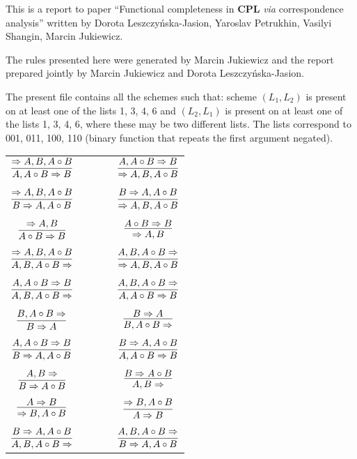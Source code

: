 \documentclass[11pt]{article}
\begin{document}
	
	This is a report to paper ``Functional completeness in \textbf{CPL} \textit{via} correspondence analysis'' written by Dorota Leszczy\'{n}ska-Jasion, 
	Yaroslav Petrukhin, Vasilyi Shangin, Marcin Jukiewicz. 
	
	The rules presented here were generated by Marcin Jukiewicz and the report prepared jointly by Marcin Jukiewicz and Dorota Leszczy\'{n}ska-Jasion.
	
	The present file contains all the schemes such that: scheme $(L_1, L_2)$ is present on at least one of the lists 1, 3, 4, 6 and $(L_2, L_1)$ is present on at least one of the lists 1, 3, 4, 6, where these may be two different lists. The lists correspond to 001, 011, 100, 110 (binary function that repeats the first argument negated).
	
	\bigskip
\begin{center}

\begin{tabular}{ccc}
$\infer{A, A\circ B\Rightarrow B}{\Rightarrow A, B, A\circ B}$ & \ \ \ \ & $\infer{\Rightarrow A, B, A\circ B}{A, A\circ B\Rightarrow B}$ \\
&& \\
$\infer{B\Rightarrow A, A\circ B}{\Rightarrow A, B, A\circ B}$ && $\infer{\Rightarrow A, B, A\circ B}{B\Rightarrow A, A\circ B}$ \\
&& \\
$\infer{A\circ B\Rightarrow B}{\Rightarrow A, B}$ && $\infer{\Rightarrow A, B}{A\circ B\Rightarrow B}$ \\
&& \\
$\infer{A, B, A\circ B\Rightarrow }{\Rightarrow A, B, A\circ B}$ && $\infer{\Rightarrow A, B, A\circ B}{A, B, A\circ B\Rightarrow }$ \\
&& \\
$\infer{A, B, A\circ B\Rightarrow }{A, A\circ B\Rightarrow B}$ && $\infer{A, A\circ B\Rightarrow B}{A, B, A\circ B\Rightarrow }$ \\
&& \\
$\infer{B\Rightarrow A}{B, A\circ B\Rightarrow }$ && $\infer{B, A\circ B\Rightarrow }{B\Rightarrow A}$ \\
&& \\
$\infer{B\Rightarrow A, A\circ B}{A, A\circ B\Rightarrow B}$ && $\infer{A, A\circ B\Rightarrow B}{B\Rightarrow A, A\circ B}$ \\
&& \\
$\infer{B\Rightarrow A\circ B}{A, B\Rightarrow }$ && $\infer{A, B\Rightarrow }{B\Rightarrow A\circ B}$ \\
&& \\
$\infer{\Rightarrow B, A\circ B}{A\Rightarrow B}$ && $\infer{A\Rightarrow B}{\Rightarrow B, A\circ B}$ \\
&& \\
$\infer{A, B, A\circ B\Rightarrow }{B\Rightarrow A, A\circ B}$ && $\infer{B\Rightarrow A, A\circ B}{A, B, A\circ B\Rightarrow }$ 
\end{tabular}



\end{center}
\end{document}
